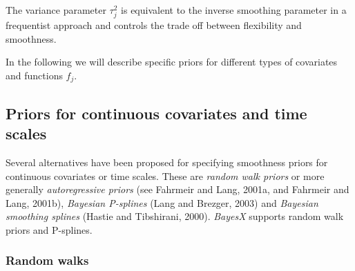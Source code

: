 \documentclass[11pt,a4paper,twoside]{bayesxarticle}
\begin{document}
The variance parameter $\tau_j^2$ is  equivalent to the inverse
smoothing parameter in a frequentist approach and controls the
trade off between flexibility and smoothness.

In the following we will describe specific priors for different
types of covariates and functions $f_j$.


\subsection{Priors for continuous covariates and time scales}
\label{psplines}

Several alternatives have been  proposed for specifying smoothness
priors for continuous covariates or time scales. These are {\em
random walk priors} or more generally {\em autoregressive priors}
(see Fahrmeir and Lang, 2001a, and Fahrmeir and Lang, 2001b), {\em
Bayesian P-splines} (Lang and Brezger, 2003) and {\em Bayesian
smoothing splines} (Hastie and Tibshirani, 2000). {\em BayesX}
supports random walk priors and P-splines.

\subsubsection{Random walks}
\end{document}

